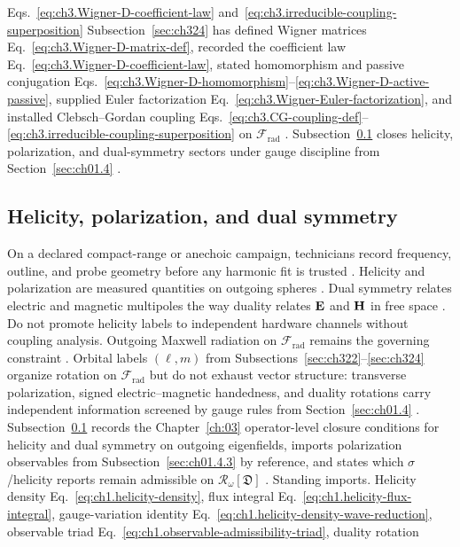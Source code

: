 Eqs.~\eqref{eq:ch3.Wigner-D-coefficient-law} and~\eqref{eq:ch3.irreducible-coupling-superposition}
Subsection~\ref{sec:ch324} has defined Wigner matrices Eq.~\eqref{eq:ch3.Wigner-D-matrix-def}, recorded the
coefficient law Eq.~\eqref{eq:ch3.Wigner-D-coefficient-law}, stated homomorphism and passive conjugation
Eqs.~\eqref{eq:ch3.Wigner-D-homomorphism}--\eqref{eq:ch3.Wigner-D-active-passive}, supplied Euler
factorization Eq.~\eqref{eq:ch3.Wigner-Euler-factorization}, and installed Clebsch--Gordan coupling
Eqs.~\eqref{eq:ch3.CG-coupling-def}--\eqref{eq:ch3.irreducible-coupling-superposition} on
\(\mathcal{F}_{\mathrm{rad}}\) .
Subsection~\ref{sec:ch325} closes helicity, polarization, and dual-symmetry sectors under gauge discipline from
Section~\ref{sec:ch01.4} .
\subsection{Helicity, polarization, and dual symmetry}
\label{sec:ch325}
On a declared compact-range or anechoic campaign, technicians record frequency, outline, and probe geometry before any harmonic fit is trusted \cite{hansen1988}. Helicity and polarization are measured quantities on outgoing spheres \cite{stratton1941}. Dual symmetry relates electric and magnetic multipoles the way duality relates $\mathbf{E}$ and $\mathbf{H}$ in free space \cite{harrington2001}. Do not promote helicity labels to independent hardware channels without coupling analysis. Outgoing Maxwell radiation on $\mathcal{F}_{\mathrm{rad}}$ remains the governing constraint \cite{stratton1941}.
Orbital labels \((\ell,m)\) from Subsections~\ref{sec:ch322}--\ref{sec:ch324} organize rotation on
\(\mathcal{F}_{\mathrm{rad}}\) but do not exhaust vector structure: transverse polarization, signed
electric--magnetic handedness, and duality rotations carry independent information screened by gauge rules
from Section~\ref{sec:ch01.4} \cite{belinfante1940}. Subsection~\ref{sec:ch325} records the
Chapter~\ref{ch:03} operator-level closure conditions for helicity and dual symmetry on outgoing eigenfields,
imports polarization observables from Subsection~\ref{sec:ch01.4.3} by reference, and states which
\(\sigma\)/helicity reports remain admissible on \(\mathcal{R}_\omega[\mathfrak{D}]\)
\cite{jackson1999}.
Standing imports. Helicity density Eq.~\eqref{eq:ch1.helicity-density}, flux integral
Eq.~\eqref{eq:ch1.helicity-flux-integral}, gauge-variation identity
Eq.~\eqref{eq:ch1.helicity-density-wave-reduction}, observable triad
Eq.~\eqref{eq:ch1.observable-admissibility-triad}, duality rotation
